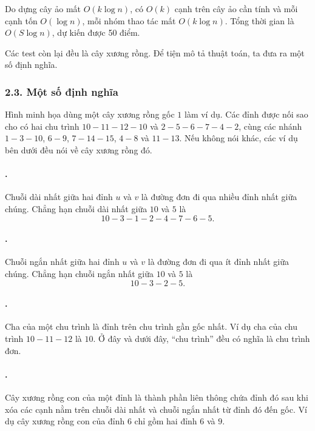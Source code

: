 \documentclass[11pt]{article}
\begin{document}
Do dựng cây ảo mất \(O(k\log n)\), có \(O(k)\) cạnh trên cây ảo cần tính và
mỗi cạnh tốn \(O(\log n)\), mỗi nhóm thao tác mất \(O(k\log n)\). Tổng thời
gian là \(O(S\log n)\), dự kiến được 50 điểm.

Các test còn lại đều là cây xương rồng. Để tiện mô tả thuật toán, ta đưa ra
một số định nghĩa.

\subsubsection*{2.3. Một số định nghĩa}

Hình minh họa dùng một cây xương rồng gốc \(1\) làm ví dụ. Các đỉnh
được nối sao cho có hai chu trình \(10-11-12-10\) và \(2-5-6-7-4-2\), cùng
các nhánh \(1-3-10\), \(6-9\), \(7-14-15\), \(4-8\) và \(11-13\).
Nếu không nói khác, các ví dụ bên dưới đều nói về cây xương rồng đó.

\paragraph{.}
Chuỗi dài nhất giữa hai đỉnh \(u\) và \(v\) là đường đơn đi qua nhiều đỉnh
nhất giữa chúng. Chẳng hạn chuỗi dài nhất giữa \(10\) và \(5\) là
\[
  10-3-1-2-4-7-6-5.
\]

\paragraph{.}
Chuỗi ngắn nhất giữa hai đỉnh \(u\) và \(v\) là đường đơn đi qua ít đỉnh nhất
giữa chúng. Chẳng hạn chuỗi ngắn nhất giữa \(10\) và \(5\) là
\[
  10-3-2-5.
\]

\paragraph{.}
Cha của một chu trình là đỉnh trên chu trình gần gốc nhất. Ví dụ cha của chu
trình \(10-11-12\) là \(10\). Ở đây và dưới đây, ``chu trình'' đều có nghĩa là
chu trình đơn.

\paragraph{.}
Cây xương rồng con của một đỉnh là thành phần liên thông chứa đỉnh đó sau khi
xóa các cạnh nằm trên chuỗi dài nhất và chuỗi ngắn nhất từ đỉnh đó đến gốc.
Ví dụ cây xương rồng con của đỉnh \(6\) chỉ gồm hai đỉnh \(6\) và \(9\).
\end{document}

